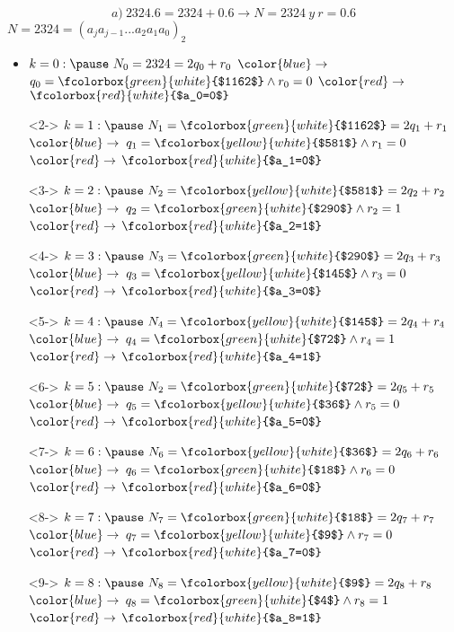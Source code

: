 \documentclass[8pt]{beamer}
\begin{document}
	\begin{frame}
		$$a) \ 2324.6=2324+0.6 \rightarrow N=2324 \ y \ r=0.6$$\pause
		\centering$N = 2324=(a_ja_{j-1}...a_2a_1a_0)_2$\pause
		\begin{itemize}
			\item $k=0 : \pause \ N_0 = 2324=2q_0+r_0$ \pause $\color{blue}\rightarrow$ $ q_0=\fcolorbox{green}{white}{$1162$}  \wedge  r_0=0$ \pause $\color{red}\rightarrow$  $\fcolorbox{red}{white}{$a_0=0$}$ 
			\item[]<2->  $k=1 : \pause \ N_1 = \fcolorbox{green}{white}{$1162$}=2q_1+r_1$ \pause $\color{blue}\rightarrow$ $ q_1=\fcolorbox{yellow}{white}{$581$}  \wedge  r_1=0$ \pause $\color{red}\rightarrow$  $\fcolorbox{red}{white}{$a_1=0$}$
			\item[]<3->  $k=2 : \pause \ N_2 = \fcolorbox{yellow}{white}{$581$}=2q_2+r_2$ \pause $\color{blue}\rightarrow$ $ q_2=\fcolorbox{green}{white}{$290$}  \wedge  r_2=1$ \pause $\color{red}\rightarrow$  $\fcolorbox{red}{white}{$a_2=1$}$
			\item[]<4-> $k=3 : \pause \ N_3 = \fcolorbox{green}{white}{$290$}=2q_3+r_3$ \pause $\color{blue}\rightarrow$ $ q_3=\fcolorbox{yellow}{white}{$145$}  \wedge  r_3=0$ \pause $\color{red}\rightarrow$  $\fcolorbox{red}{white}{$a_3=0$}$
			\item[]<5->  $k=4 : \pause \ N_4 = \fcolorbox{yellow}{white}{$145$}=2q_4+r_4$ \pause $\color{blue}\rightarrow$ $ q_4=\fcolorbox{green}{white}{$72$}  \wedge  r_4=1$ \pause $\color{red}\rightarrow$  $\fcolorbox{red}{white}{$a_4=1$}$
			\item[]<6->  $k=5 : \pause \ N_2 = \fcolorbox{green}{white}{$72$}=2q_5+r_5$ \pause $\color{blue}\rightarrow$ $ q_5=\fcolorbox{yellow}{white}{$36$}  \wedge  r_5=0$ \pause $\color{red}\rightarrow$  $\fcolorbox{red}{white}{$a_5=0$}$
			\item[]<7-> $k=6 : \pause \ N_6 = \fcolorbox{yellow}{white}{$36$}=2q_6+r_6$ \pause $\color{blue}\rightarrow$ $ q_6=\fcolorbox{green}{white}{$18$}  \wedge  r_6=0$ \pause $\color{red}\rightarrow$  $\fcolorbox{red}{white}{$a_6=0$}$
			\item[]<8->  $k=7 : \pause \ N_7 = \fcolorbox{green}{white}{$18$}=2q_7+r_7$ \pause $\color{blue}\rightarrow$ $ q_7=\fcolorbox{yellow}{white}{$9$}  \wedge  r_7=0$ \pause $\color{red}\rightarrow$  $\fcolorbox{red}{white}{$a_7=0$}$
			\item[]<9-> $k=8 : \pause \ N_8 = \fcolorbox{yellow}{white}{$9$}=2q_8+r_8$ \pause $\color{blue}\rightarrow$ $ q_8=\fcolorbox{green}{white}{$4$}  \wedge  r_8=1$ \pause $\color{red}\rightarrow$  $\fcolorbox{red}{white}{$a_8=1$}$

\end{itemize}
\end{frame}
\end{document}
